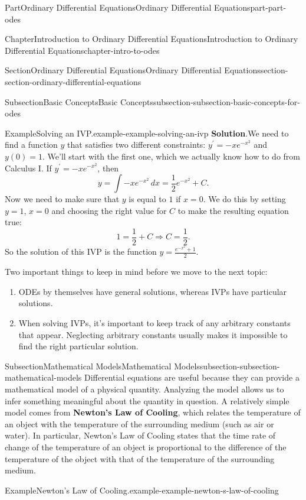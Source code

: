 \documentclass[twoside,10pt,]{book}
\newcommand{\blocktitlefont}{\relax}
\newcommand{\terminology}[1]{\textbf{#1}}
\numberwithin{equation}{part}
\begin{document}
\begin{partptx}{Part}{Ordinary Differential Equations}{}{Ordinary Differential Equations}{}{}{part-part-odes}
\begin{chapterptx}{Chapter}{Introduction to Ordinary Differential Equations}{}{Introduction to Ordinary Differential Equations}{}{}{chapter-intro-to-odes}
\begin{sectionptx}{Section}{Ordinary Differential Equations}{}{Ordinary Differential Equations}{}{}{section-section-ordinary-differential-equations}
\begin{subsectionptx}{Subsection}{Basic Concepts}{}{Basic Concepts}{}{}{subsection-subsection-basic-concepts-for-odes}
\begin{example}{Example}{Solving an IVP.}{example-example-solving-an-ivp}
\noindent\textbf{\blocktitlefont Solution}.\hypertarget{solution-example-solving-an-ivp-c}{}\quad{}We need to find a function \(y\) that satisfies two different constraints: \(y^\prime = -xe^{-x^{2}}\) and \(y(0)=1\). We'll start with the first one, which we actually know how to do from Calculus I. If \(y^\prime = -xe^{-x^{2}}\), then%
\begin{equation*}
y = \int -xe^{-x^{2}}\,dx = \frac{1}{2}e^{-x^{2}}+C.
\end{equation*}
Now we need to make sure that \(y\) is equal to \(1\) if \(x=0\). We do this by setting \(y=1\), \(x=0\) and choosing the right value for \(C\) to make the resulting equation true:%
\begin{equation*}
1 = \frac{1}{2} + C \Rightarrow C = \frac{1}{2}.
\end{equation*}
So the solution of this IVP is the function \(y = \frac{e^{-x^{2}}+1}{2}\).%
\end{example}
Two important things to keep in mind before we move to the next topic:%
\begin{enumerate}
\item{}ODEs by themselves have general solutions, whereas IVPs have particular solutions.%
\item{}When solving IVPs, it's important to keep track of any arbitrary constants that appear. Neglecting arbitrary constants usually makes it impossible to find the right particular solution.%
\end{enumerate}
%
\end{subsectionptx}
%
%
\typeout{************************************************}
\typeout{************************************************}
%
\begin{subsectionptx}{Subsection}{Mathematical Models}{}{Mathematical Models}{}{}{subsection-subsection-mathematical-models}
Differential equations are useful because they can provide a mathematical model of a physical quantity. Analyzing the model allows us to infer something meaningful about the quantity in question. A relatively simple model comes from \terminology{Newton's Law of Cooling}, which relates the temperature of an object with the temperature of the surrounding medium (such as air or water). In particular, Newton's Law of Cooling states that the time rate of change of the temperature of an object is proportional to the difference of the temperature of the object with that of the temperature of the surrounding medium.%
\begin{example}{Example}{Newton's Law of Cooling.}{example-example-newton-s-law-of-cooling}%

\end{example}
\end{subsectionptx}
\end{sectionptx}
\end{chapterptx}
\end{partptx}
\end{document}

